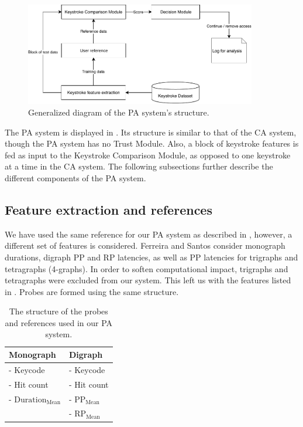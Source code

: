 \begin{figure}[h]
    \centering
    \includegraphics[width=0.9\textwidth]{figures/PA-diagram.pdf}
    \caption{Generalized diagram of the PA system's structure.}
    \label{fig:PA-diagram}
\end{figure}

The PA system is displayed in .
Its structure is similar to that of the CA system, though the PA system has no Trust Module. 
Also, a block of keystroke features is fed as input to the Keystroke Comparison Module, as opposed to one keystroke at a time in the CA system.
The following subsections further describe the different components of the PA system.

\subsection{Feature extraction and references}
We have used the same reference for our PA system as described in , however, a different set of features is considered.
Ferreira and Santos \cite{superResults} consider monograph durations, digraph PP and RP latencies, as well as PP latencies for trigraphs and tetragraphs (4-graphs).
In order to soften computational impact, trigraphs and tetragraphs were excluded from our system.
This left us with the features listed in .
Probes are formed using the same structure.

\begin{table}[h]
\centering
\begin{tabular}{|l|l|}
\hline
Monograph & Digraph\\ \hline
- Keycode & - Keycode\\
- Hit count & - Hit count\\
- $\text{Duration}_{\text{Mean}} $& - $\text{PP}_{\text{Mean}}$\\
& - $\text{RP}_{\text{Mean}}$ \\
\hline
\end{tabular}

\caption{The structure of the probes and references used in our PA system.}
\label{tab:PA-reference-structure}
\end{table}

